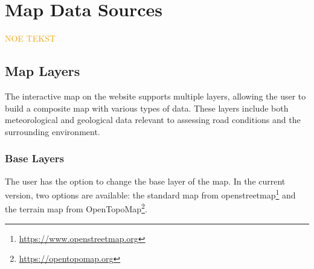 \chapter{Map Data Sources}

\textcolor{orange}{NOE TEKST}

\section{Map Layers}

The interactive map on the website supports multiple layers, allowing the user to build a composite map with various types of data. These layers include both meteorological and geological data relevant to assessing road conditions and the surrounding environment.

\subsection{Base Layers}

The user has the option to change the base layer of the map. In the current version, two options are available: the standard map from \Gls{openstreetmap}\footnote{\url{https://www.openstreetmap.org}} and the terrain map from OpenTopoMap\footnote{\url{https://opentopomap.org}}.

